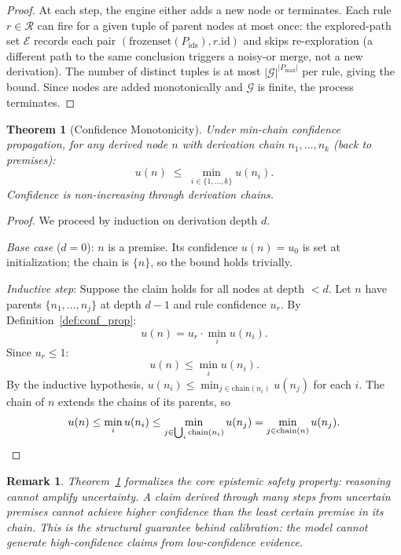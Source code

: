 \documentclass[12pt]{article}
\newtheorem{theorem}{Theorem}
\newtheorem{remark}{Remark}
\theoremstyle{definition}
\begin{document}
\begin{proof}
At each step, the engine either adds a new node or terminates. Each
rule $r \in \mathcal{R}$ can fire for a given tuple of parent nodes
at most once: the explored-path set $\mathcal{E}$ records each pair
$(\mathrm{frozenset}(P_{\text{ids}}), r.\mathrm{id})$ and skips
re-exploration (a different path to the same conclusion triggers
a noisy-or merge, not a new derivation). The number of distinct
tuples is at most $|\mathcal{G}|^{|P_{\max}|}$ per rule, giving
the bound. Since nodes are added monotonically and $\mathcal{G}$
is finite, the process terminates.
\end{proof}

\begin{theorem}[Confidence Monotonicity]
\label{thm:monotone}
Under min-chain confidence propagation, for any derived node $n$
with derivation chain $n_1, \ldots, n_k$ (back to premises):
\[
  u(n) \;\leq\; \min_{i \in \{1,\ldots,k\}} u(n_i).
\]
Confidence is non-increasing through derivation chains.
\end{theorem}

\begin{proof}
We proceed by induction on derivation depth $d$.

\textit{Base case} ($d=0$): $n$ is a premise. Its confidence
$u(n) = u_0$ is set at initialization; the chain is $\{n\}$,
so the bound holds trivially.

\textit{Inductive step}: Suppose the claim holds for all nodes
at depth $< d$. Let $n$ have parents $\{n_1,\ldots,n_j\}$ at
depth $d-1$ and rule confidence $u_r$. By
Definition~\ref{def:conf_prop}:
\[
  u(n) = u_r \cdot \min_i u(n_i).
\]
Since $u_r \leq 1$:
\[
  u(n) \leq \min_i u(n_i).
\]
By the inductive hypothesis, $u(n_i) \leq \min_{j \in \text{chain}(n_i)} u(n_j)$
for each $i$. The chain of $n$ extends the chains of its parents, so
\[
  u(n) \leq \min_i u(n_i) \leq
  \min_{j \in \bigcup_i \text{chain}(n_i)} u(n_j)
  = \min_{j \in \text{chain}(n)} u(n_j). \qedhere
\]
\end{proof}

\begin{remark}
Theorem~\ref{thm:monotone} formalizes the core epistemic safety
property: reasoning cannot amplify uncertainty. A claim derived
through many steps from uncertain premises cannot achieve higher
confidence than the least certain premise in its chain. This is
the structural guarantee behind calibration: the model cannot
generate high-confidence claims from low-confidence evidence.
\end{remark}
\end{document}
